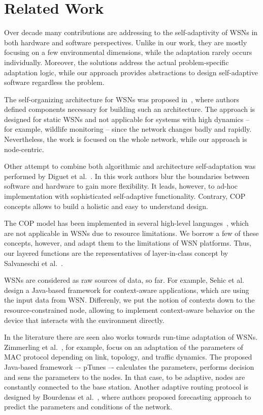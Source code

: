 \section{Related Work}\label{sec:related}

Over decade many contributions are addressing to the self-adaptivity of WSNs in
both hardware and software perspectives. Unlike in our work, they are mostly
focusing on a few environmental dimensions, while the adaptation rarely occurs
individually. Moreover, the solutions address the actual problem-specific
adaptation logic, while our approach provides abstractions to design
self-adaptive software regardless the problem.

The self-organizing architecture for WSNs was proposed in~\cite{Subramanian00},
where authors defined components necessary for building such an architecture.
The approach is designed for static WSNs and not applicable for systems with
high dynamics -- for example, wildlife monitoring -- since the network changes
badly and rapidly. Nevertheless, the work is focused on the whole network, while
our approach is node-centric.

Other attempt to combine both algorithmic and architecture self-adaptation was
performed by Diguet et al.~\cite{Diguet11}. In this work authors blur the
boundaries between software and hardware to gain more flexibility. It leads,
however, to ad-hoc implementation with sophisticated self-adaptive
functionality. Contrary, COP concepts allows to build a holistic and easy to
understand design.

The COP model has been implemented in several high-level
languages~\cite{Bardram05,Ghezzi10,Kamina11,Salvaneschi12,Sehic11}, which are
not applicable in WSNs due to resource limitations. We borrow a few of these
concepts, however, and adapt them to the limitations of WSN platforms. Thus, our
layered functions are the representatives of layer-in-class concept by
Salvaneschi et al.~\cite{Salvaneschi12}.

WSNs are considered as raw sources of data, so far. For example, Sehic et
al.~\cite{Sehic11} design a Java-based framework for context-aware applications,
which are using the input data from WSN. Differenly, we put the notion of
contexts down to the resource-constrained node, allowing to implement
context-aware behavior on the device that interacts with the environment
directly.

In the literature there are seen also works towards run-time adaptation of WSNs.
Zimmerling et al.~\cite{Zimmerling12}, for example, focus on an adaptation of
the parameters of MAC protocol depending on link, topology, and traffic
dynamics. The proposed Java-based framework –- pTunes –- calculates the
parameters, performs decision and sens the parameters to the nodes. In that
case, to be adaptive, nodes are constantly connected to the base station.
Another adaptive routing protocol is designed by Bourdenas et
al.~\cite{Bourdenas11}, where authors proposed forecasting approach to predict
the parameters and conditions of the network.

